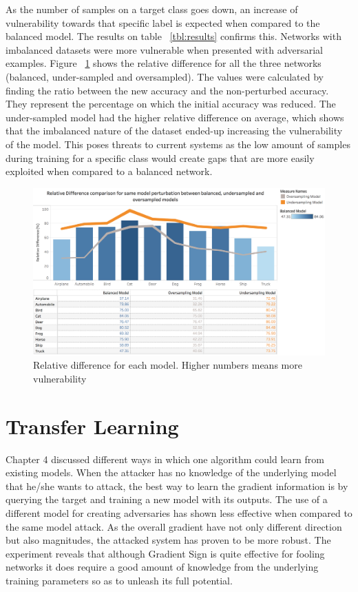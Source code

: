 As the number of samples on a target class goes down, an increase of vulnerability towards that specific label is expected when compared to the balanced model. The results on table  ~\ref{tbl:results} confirms this. Networks with imbalanced datasets were more vulnerable when presented with adversarial examples. Figure ~\ref{fig:relative_difference} shows the relative difference for all the three networks (balanced, under-sampled and oversampled).  The values were calculated by finding the ratio between the new accuracy and the non-perturbed accuracy. They represent the percentage on which the initial accuracy was reduced. The under-sampled model had the higher relative difference on average, which shows that the imbalanced nature of the dataset ended-up increasing the vulnerability of the model. This poses threats to current systems as the low amount of samples during training for a specific class would  create gaps that are more easily exploited when compared to a balanced network.

\begin{figure}[H]
	\centering
	\includegraphics[scale=0.3]{rel_diff_graph.png}
	\caption{Relative difference for each model. Higher numbers means more vulnerability}
	\label{fig:relative_difference}
\end{figure}

\section{Transfer Learning}

Chapter 4 discussed different ways in which one algorithm could learn from existing models. When the attacker has no knowledge of the underlying model that he/she wants to attack, the best way to learn the gradient information is by querying the target and training a new model with its outputs. The use of a different model for creating adversaries has shown less effective when compared to the same model attack. As the overall gradient have not only different direction but also magnitudes, the attacked system has proven to be more robust. The experiment reveals that although Gradient Sign is quite effective for fooling networks it does require a good amount of knowledge from the underlying training parameters so as to unleash its full potential.

